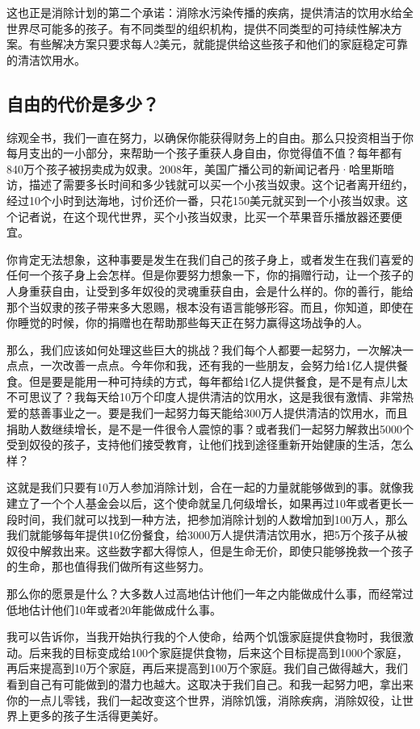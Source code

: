 这也正是消除计划的第二个承诺：消除水污染传播的疾病，提供清洁的饮用水给全世界尽可能多的孩子。有不同类型的组织机构，提供不同类型的可持续性解决方案。有些解决方案只要求每人2美元，就能提供给这些孩子和他们的家庭稳定可靠的清洁饮用水。

\subsection{自由的代价是多少？}

综观全书，我们一直在努力，以确保你能获得财务上的自由。那么只投资相当于你每月支出的一小部分，来帮助一个孩子重获人身自由，你觉得值不值？每年都有840万个孩子被拐卖成为奴隶。2008年，美国广播公司的新闻记者丹·哈里斯暗访，描述了需要多长时间和多少钱就可以买一个小孩当奴隶。这个记者离开纽约，经过10个小时到达海地，讨价还价一番，只花150美元就买到一个小孩当奴隶。这个记者说，在这个现代世界，买个小孩当奴隶，比买一个苹果音乐播放器还要便宜。

你肯定无法想象，这种事要是发生在我们自己的孩子身上，或者发生在我们喜爱的任何一个孩子身上会怎样。但是你要努力想象一下，你的捐赠行动，让一个孩子的人身重获自由，让受到多年奴役的灵魂重获自由，会是什么样的。你的善行，能给那个当奴隶的孩子带来多大恩赐，根本没有语言能够形容。而且，你知道，即使在你睡觉的时候，你的捐赠也在帮助那些每天正在努力赢得这场战争的人。

那么，我们应该如何处理这些巨大的挑战？我们每个人都要一起努力，一次解决一点点，一次改善一点点。今年你和我，还有我的一些朋友，会努力给1亿人提供餐食。但是要是能用一种可持续的方式，每年都给1亿人提供餐食，是不是有点儿太不可思议了？我每天给10万个印度人提供清洁的饮用水，这是我很有激情、非常热爱的慈善事业之一。要是我们一起努力每天能给300万人提供清洁的饮用水，而且捐助人数继续增长，是不是一件很令人震惊的事？或者我们一起努力解救出5000个受到奴役的孩子，支持他们接受教育，让他们找到途径重新开始健康的生活，怎么样？

这就是我们只要有10万人参加消除计划，合在一起的力量就能够做到的事。就像我建立了一个个人基金会以后，这个使命就呈几何级增长，如果再过10年或者更长一段时间，我们就可以找到一种方法，把参加消除计划的人数增加到100万人，那么我们就能够每年提供10亿份餐食，给3000万人提供清洁饮用水，把5万个孩子从被奴役中解救出来。这些数字都大得惊人，但是生命无价，即使只能够挽救一个孩子的生命，那也值得我们做所有这些努力。

那么你的愿景是什么？大多数人过高地估计他们一年之内能做成什么事，而经常过低地估计他们10年或者20年能做成什么事。

我可以告诉你，当我开始执行我的个人使命，给两个饥饿家庭提供食物时，我很激动。后来我的目标变成给100个家庭提供食物，后来这个目标提高到1000个家庭，再后来提高到10万个家庭，再后来提高到100万个家庭。我们自己做得越大，我们看到自己有可能做到的潜力也越大。这取决于我们自己。和我一起努力吧，拿出来你的一点儿零钱，我们一起改变这个世界，消除饥饿，消除疾病，消除奴役，让世界上更多的孩子生活得更美好。

